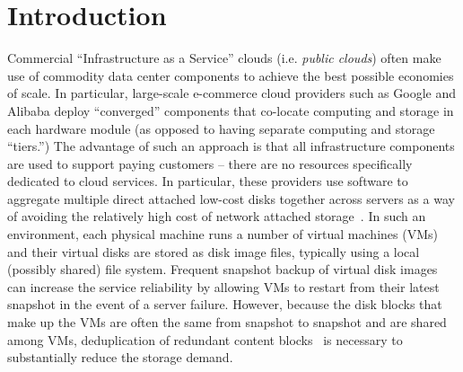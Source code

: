 \section{Introduction}

Commercial ``Infrastructure as a Service'' clouds (i.e. {\em public
clouds}) often make use of commodity data center components to achieve the
best possible economies of scale.  In particular, large-scale e-commerce cloud
providers such as Google and Alibaba deploy ``converged'' components that
co-locate computing and storage in each hardware module (as opposed to having
separate computing and storage ``tiers.'')  The advantage of such an approach
is that all infrastructure components are used to support paying customers --
there are no resources specifically dedicated to cloud services.
In particular, these providers use software to
aggregate multiple direct attached low-cost disks together across
servers as a way of avoiding the relatively high cost of network attached 
storage~\cite{googlefs03,hdfs10,NutanixPaper}.
In such an environment,
each physical machine runs a number of virtual machines (VMs)
and their virtual disks are stored as disk image files, typically
using a local (possibly shared) file system.
Frequent snapshot backup of virtual disk images can
increase the service reliability by allowing VMs to restart from their latest
snapshot in the event of a server failure.  However, because the disk
blocks that make up the VMs are often the same from snapshot to snapshot
and are shared among VMs,  
deduplication of redundant content
blocks~\cite{venti02,bottleneck08} is necessary to substantially reduce the
storage demand.

